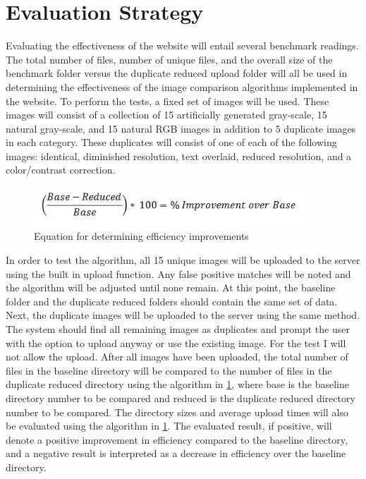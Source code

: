 \documentclass[11pt]{article}
\begin{document}
\vspace*{-.2in}
\section{Evaluation Strategy}
\label{sec:evaluate}
\vspace*{-.1in}


Evaluating the effectiveness of the website will entail several benchmark readings. The total number of files, number of unique files, and the overall size of the benchmark folder versus the duplicate reduced upload folder will all be used in determining the effectiveness of the image comparison algorithms implemented in the website. To perform the tests, a fixed set of images will be used. These images will consist of a collection of 15 artificially generated gray-scale, 15 natural gray-scale, and 15 natural RGB images in addition to 5 duplicate images in each category. These duplicates will consist of one of each of the following images: identical, diminished resolution, text overlaid, reduced resolution, and a color/contrast correction.

\begin{figure}[htbp]
\centering
\includegraphics[width=4in]{benchmark_eq}
\caption{Equation for determining efficiency improvements}
\label{benchmark_eq}
\end{figure}

In order to test the algorithm, all 15 unique images will be uploaded to the server using the built in upload function. Any false positive matches will be noted and the algorithm will be adjusted until none remain. At this point, the baseline folder and the duplicate reduced folders should contain the same set of data. Next, the duplicate images will be uploaded to the server using the same method. The system should find all remaining images as duplicates and prompt the user with the option to upload anyway or use the existing image. For the test I will not allow the upload. After all images have been uploaded, the total number of files in the baseline directory will be compared to the number of files in the duplicate reduced directory using the algorithm in \ref{benchmark_eq}, where base is the baseline directory number to be compared and reduced is the duplicate reduced directory number to be compared.  The directory sizes and average upload times will also be evaluated using the algorithm in \ref{benchmark_eq}. The evaluated result, if positive, will denote a positive improvement in efficiency compared to the baseline directory, and a negative result is interpreted as a decrease in efficiency over the baseline directory.
\end{document}
